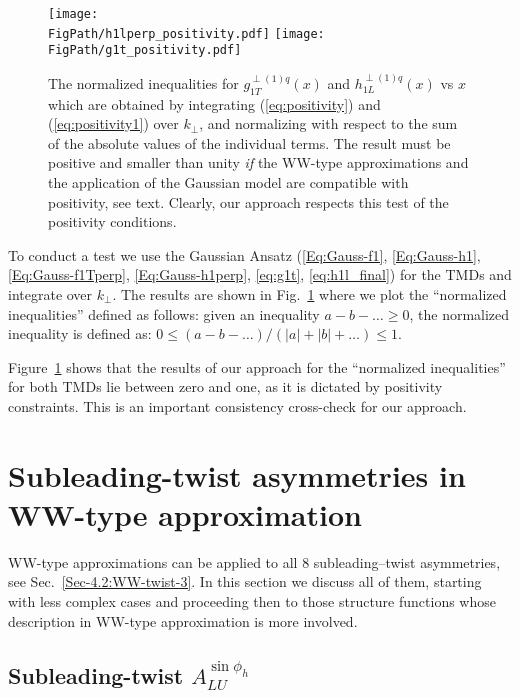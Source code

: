 \documentclass[a4paper,11pt]{article}
\def\kperp{k_\perp}
\newcommand*{\FigPath}{./figs}%
\begin{document}
\begin{figure}[b!]
\centering
\texttt{[image: \\FigPath/h1lperp\_positivity.pdf]} \quad  
\texttt{[image: \\FigPath/g1t\_positivity.pdf]}  
	\caption{\label{h1l_pos} 
	The normalized inequalities for $g^{\perp(1)q}_{1T}(x)$ and
	$h^{\perp(1)q}_{1L}(x)$ vs $x$ which are obtained by integrating
	(\ref{eq:positivity}) and (\ref{eq:positivity1}) over $\kperp$,
	and normalizing with respect to the sum of the absolute
	values of the individual terms. The result must be positive and 
	smaller than unity {\it if} the WW-type approximations
	and the application of the Gaussian model are compatible
	with positivity, see text. Clearly, our approach respects 
	this test of the positivity conditions.}
\end{figure}

To conduct a test we use the Gaussian Ansatz 
(\ref{Eq:Gauss-f1}, \ref{Eq:Gauss-h1}, \ref{Eq:Gauss-f1Tperp}, 
\ref{Eq:Gauss-h1perp}, \ref{eq:g1t}, \ref{eq:h1l_final}) for the
TMDs and integrate over $k_\perp$. The results are shown in 
Fig.~\ref{h1l_pos} where we plot the ``normalized inequalities'' 
defined as follows:
given an inequality $a-b-\dots \ge 0$, the normalized inequality 
is defined as: $0 \le (a-b-\dots)/(|a|+|b|+\dots) \le 1$.

Figure~\ref{h1l_pos} shows that the results of our approach for the 
``normalized inequalities'' for both TMDs lie between 
zero and one, as it is dictated by positivity constraints.
This is an important consistency cross-check for our approach.


\section{Subleading-twist asymmetries in WW-type approximation}
\label{Sec-7:twist-3-and-WW}

WW-type approximations can be applied to all 8 subleading--twist asymmetries,
see Sec.~\ref{Sec-4.2:WW-twist-3}. In this section we discuss all of them,
starting with less complex cases and proceeding then to those structure 
functions whose description in WW-type approximation is more involved.

\subsection{\boldmath Subleading-twist  $A_{LU}^{\sin\phi_h}$}
\label{Sec-7.1:FLU}
\end{document}
